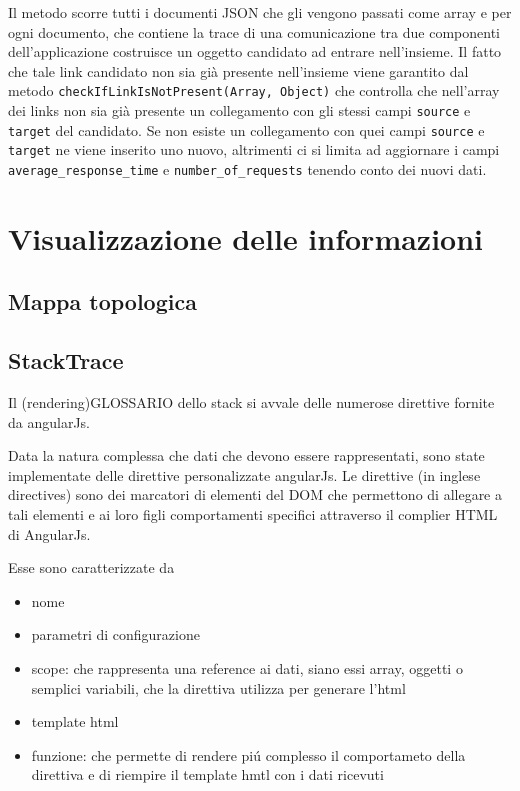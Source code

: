 	Il metodo scorre tutti i documenti JSON che gli vengono passati come array e per ogni documento, che contiene la trace di una comunicazione tra due componenti dell'applicazione costruisce un oggetto candidato ad entrare nell'insieme. Il fatto che tale link candidato non sia già presente nell'insieme viene garantito dal metodo \texttt{checkIfLinkIsNotPresent(Array, Object)} che controlla che nell'array dei links non sia già presente un collegamento con gli stessi campi \texttt{source} e \texttt{target} del candidato. Se non esiste un collegamento con quei campi \texttt{source} e \texttt{target} ne viene inserito uno nuovo, altrimenti ci si limita ad aggiornare i campi \texttt{average\_response\_time} e \texttt{number\_of\_requests} tenendo conto dei nuovi dati. 

\section{Visualizzazione delle informazioni}

\subsection{Mappa topologica}

\subsection{StackTrace}
	Il (rendering)GLOSSARIO dello stack si avvale delle numerose direttive fornite da
angularJs.


Data la natura complessa che dati che devono essere rappresentati, sono state
implementate delle direttive personalizzate angularJs.
Le direttive (in inglese directives) sono dei marcatori di elementi del DOM che permettono di allegare
a tali elementi e ai loro figli comportamenti specifici attraverso il complier
HTML di AngularJs.

Esse sono  caratterizzate da
	\begin{itemize}
		\item nome
		\item parametri di configurazione
		\item scope:  che rappresenta una reference ai dati, siano essi array, oggetti o
				semplici variabili, che la direttiva utilizza per generare l'html
		\item template html
		\item funzione: che permette di rendere piú complesso il comportameto della direttiva
					e di riempire il template hmtl con i dati ricevuti
	\end{itemize}

